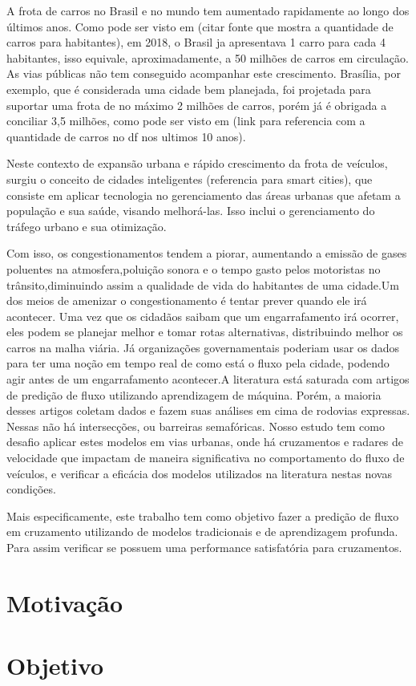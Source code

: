 
A frota  de  carros no Brasil e no mundo  tem  aumentado rapidamente ao  longo  dos  últimos anos. Como pode ser visto em (citar fonte que mostra a quantidade de carros para habitantes), em 2018, o Brasil ja apresentava 1 carro para cada 4 habitantes, isso equivale, aproximadamente, a 50 milhões de carros em circulação. As vias públicas não tem conseguido acompanhar este crescimento. Brasília, por exemplo, que é considerada uma cidade bem planejada, foi projetada para suportar uma frota de no máximo 2 milhões de carros, porém já é obrigada a conciliar 3,5 milhões, como pode ser visto em (link para referencia com a quantidade de carros no df nos ultimos 10 anos).

Neste contexto de expansão urbana e rápido crescimento da frota de veículos, surgiu o conceito de cidades inteligentes (referencia para smart cities), que consiste em aplicar tecnologia no gerenciamento das áreas urbanas que afetam a população e sua saúde, visando melhorá-las. Isso inclui o gerenciamento do tráfego urbano e sua otimização. 

Com  isso,  os  congestionamentos  tendem  a piorar, aumentando a emissão de gases poluentes na atmosfera,poluição sonora e o tempo gasto pelos motoristas no trânsito,diminuindo  assim  a  qualidade  de  vida  do  habitantes  de  uma cidade.Um  dos  meios  de  amenizar  o  congestionamento  é  tentar prever  quando  ele  irá  acontecer.  Uma  vez  que  os  cidadãos saibam  que  um  engarrafamento  irá  ocorrer,  eles  podem  se planejar melhor e tomar rotas alternativas, distribuindo melhor os  carros  na  malha  viária.  Já  organizações  governamentais poderiam  usar  os  dados  para  ter  uma  noção  em  tempo  real de  como está  o  fluxo pela  cidade,  podendo agir  antes de  um engarrafamento acontecer.A literatura está saturada com artigos de predição de fluxo utilizando aprendizagem de máquina. Porém, a maioria desses artigos  coletam  dados  e  fazem  suas  análises  em  cima  de rodovias  expressas.  Nessas  não  há  intersecções,  ou  barreiras semafóricas.  Nosso  estudo  tem  como  desafio  aplicar  estes modelos  em  vias  urbanas,  onde  há  cruzamentos  e  radares  de velocidade que impactam de maneira significativa no comportamento do fluxo de veículos, e verificar a eficácia dos modelos utilizados na literatura nestas novas condições.

Mais especificamente, este trabalho tem como objetivo fazer a  predição  de  fluxo  em  cruzamento  utilizando  de  modelos tradicionais e de aprendizagem profunda. Para assim verificar se possuem uma performance satisfatória para cruzamentos.
\section{Motivação}



\section{Objetivo}

